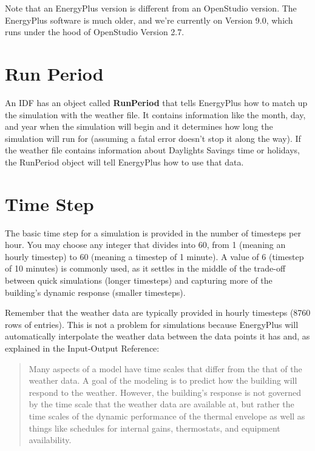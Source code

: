 \documentclass[10pt]{article}
\begin{document}
Note that an EnergyPlus version is different from an OpenStudio version. The EnergyPlus software is much older, and we're currently on Version 9.0, which runs under the hood of OpenStudio Version 2.7.

\section{Run Period}
\label{runper}

An IDF has an object called \textbf{RunPeriod} that tells EnergyPlus how to match up the simulation with the weather file. It contains information like the month, day, and year when the simulation will begin and it determines how long the simulation will run for (assuming a fatal error doesn't stop it along the way). If the weather file contains information about Daylights Savings time or holidays, the RunPeriod object will tell EnergyPlus how to use that data.

\section{Time Step}

The basic time step for a simulation is provided in the number of timesteps per hour. You may choose any integer that divides into 60, from 1 (meaning an hourly timestep) to 60 (meaning a timestep of 1 minute). A value of 6 (timestep of 10 minutes) is commonly used, as it settles in the middle of the trade-off between quick simulations (longer timesteps) and capturing more of the building's dynamic response (smaller timesteps).

Remember that the weather data are typically provided in hourly timesteps (8760 rows of entries). This is not a problem for simulations because EnergyPlus will automatically interpolate the weather data between the data points it has and, as explained in the Input-Output Reference:

\begin{quote}
    Many aspects of a model have time scales that differ from the that of the weather data. A
goal of the modeling is to predict how the building will respond to the weather. However, the building's response is not governed by the time scale that the weather data are available at, but rather the time scales of the dynamic performance of the thermal envelope as well as things like schedules for internal gains, thermostats, and equipment availability. \cite{EP9docs}
\end{quote}
\end{document}
